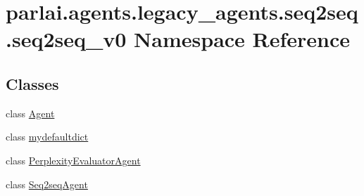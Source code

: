 \hypertarget{namespaceparlai_1_1agents_1_1legacy__agents_1_1seq2seq_1_1seq2seq__v0}{}\section{parlai.\+agents.\+legacy\+\_\+agents.\+seq2seq.\+seq2seq\+\_\+v0 Namespace Reference}
\label{namespaceparlai_1_1agents_1_1legacy__agents_1_1seq2seq_1_1seq2seq__v0}
\subsection*{Classes}
\begin{DoxyCompactItemize}
\item 
class \hyperlink{classparlai_1_1agents_1_1legacy__agents_1_1seq2seq_1_1seq2seq__v0_1_1Agent}{Agent}
\item 
class \hyperlink{classparlai_1_1agents_1_1legacy__agents_1_1seq2seq_1_1seq2seq__v0_1_1mydefaultdict}{mydefaultdict}
\item 
class \hyperlink{classparlai_1_1agents_1_1legacy__agents_1_1seq2seq_1_1seq2seq__v0_1_1PerplexityEvaluatorAgent}{Perplexity\+Evaluator\+Agent}
\item 
class \hyperlink{classparlai_1_1agents_1_1legacy__agents_1_1seq2seq_1_1seq2seq__v0_1_1Seq2seqAgent}{Seq2seq\+Agent}
\end{DoxyCompactItemize}
